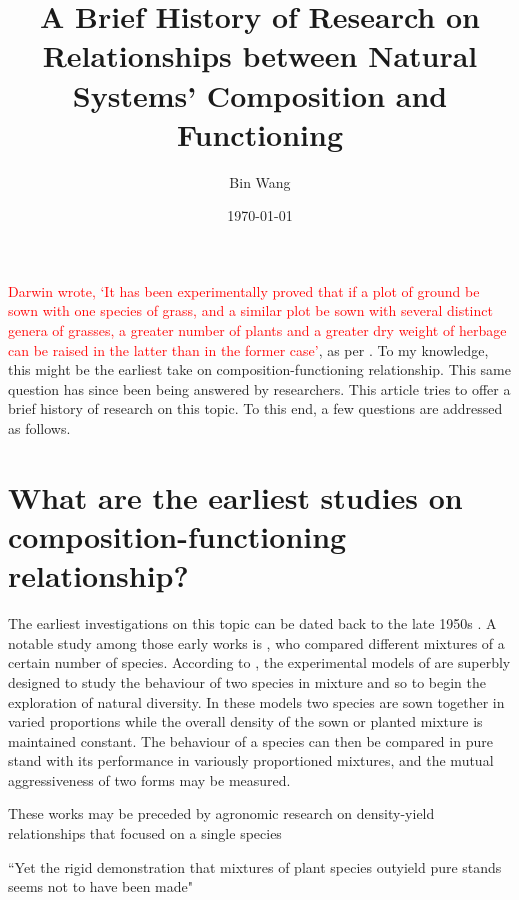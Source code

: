 \documentclass[letterpaper, 10pt]{article}
\begin{document}
\setlength{\droptitle}{-10em} 
\title{\textbf{A Brief History of Research on Relationships between Natural Systems' Composition and
Functioning}\vspace{-0em}}
\author{Bin Wang\vspace{-1em}}
\date{\today\vspace{-1em}}
\maketitle

\textcolor{red}{Darwin wrote, `It has been experimentally proved that if a plot of ground be sown with one species of grass, and a similar plot be sown with several distinct genera of grasses, a greater number of plants and a greater dry weight of herbage can be raised in the latter than in the former case'}, as per \citet{harperdarwinian}. To my knowledge, this might be the earliest take on composition-functioning relationship. This same question has since been being answered by researchers. This article tries to offer a brief history of research on this topic. To this end, a few questions are addressed as follows.

\section{What are the earliest studies on composition-functioning relationship?}

The earliest investigations on this topic can be dated back to the late 1950s \citep{de1960competitionthesis, de1960competition, harperdarwinian}. A notable study among those early works is \citep{de1960competition}, who compared different mixtures of a certain number of species. According to \citep{harperdarwinian}, the experimental models of \citep{de1960competition} are superbly designed to study the behaviour of two species in mixture and so to begin the exploration of natural diversity. In these models two species are sown together in varied proportions while the overall density of the sown or planted mixture is maintained constant. The behaviour of a species can then be compared in pure stand with its performance in variously proportioned mixtures, and the mutual aggressiveness of two forms may be measured.

These works may be preceded by agronomic research on density-yield relationships that focused on a single species \citep{harperdarwinian} 

``Yet the rigid demonstration that mixtures of plant species outyield pure stands seems not to have been made" \citep{harperdarwinian}
\end{document}
